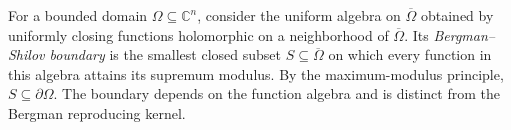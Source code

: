
For a bounded domain $\Omega\subseteq\mathbb C^n$, consider the uniform algebra on $\overline\Omega$ obtained by uniformly closing functions holomorphic on a neighborhood of $\overline\Omega$. Its \emph{Bergman--Shilov boundary} is the smallest closed subset $S\subseteq\overline\Omega$ on which every function in this algebra attains its supremum modulus. By the maximum-modulus principle, $S\subseteq\partial\Omega$. The boundary depends on the function algebra and is distinct from the Bergman reproducing kernel.
